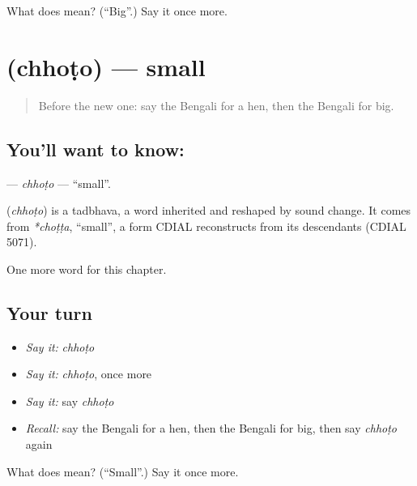\begin{tcolorbox}[breakable,colback=teal!4,colframe=teal!35!black,title={Before you move on}]
What does  mean? (\textquotedblleft{}Big\textquotedblright{}.) Say it once more.
\end{tcolorbox}
\section[\texorpdfstring{\bn{ছোট} (chhoṭo)}{ছোট (chhoṭo)}]{ (chhoṭo) — small}

\label{lesson:BN-C72-chhoto}



\begin{quote}
Before the new one: say the Bengali for a hen, then the Bengali for big.
\end{quote}

\subsection*{You'll want to know: }
\textbf{} — \emph{chhoṭo} — \textquotedblleft{}small\textquotedblright{}.

\begin{cousinweb}
\textbf{} (\emph{chhoṭo}) is a tadbhava, a word inherited and reshaped by sound change. It comes from \emph{*choṭṭa}, \textquotedblleft{}small\textquotedblright{}, a form CDIAL reconstructs from its descendants (CDIAL 5071).
\end{cousinweb}

\begin{grammarlens}[title={What you've built}]
One more word for this chapter.
\end{grammarlens}

\subsection*{Your turn}
\begin{itemize}
\raggedright
  \item \emph{Say it:} \emph{chhoṭo}
  \item \emph{Say it:} \emph{chhoṭo}, once more
  \item \emph{Say it:} say \emph{chhoṭo}
  \item \emph{Recall:} say the Bengali for a hen, then the Bengali for big, then say \emph{chhoṭo} again
\end{itemize}

\begin{tcolorbox}[breakable,colback=teal!4,colframe=teal!35!black,title={Before you move on}]
What does  mean? (\textquotedblleft{}Small\textquotedblright{}.) Say it once more.
\end{tcolorbox}
